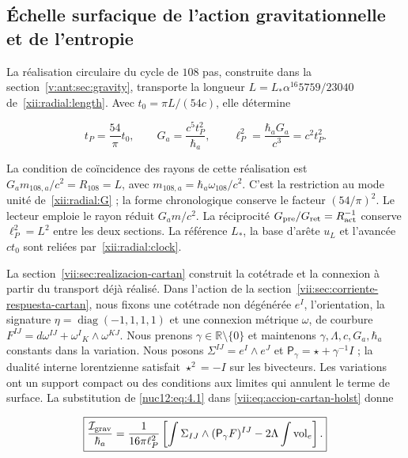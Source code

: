 \subsection{Échelle surfacique de l’action gravitationnelle et de l’entropie}

La réalisation circulaire du cycle de \(108\) pas, construite dans la section~\ref{v:ant:sec:gravity}, transporte la longueur \(L=L_*\alpha^{16}5759/23040\) de~\eqref{xii:radial:length}. Avec \(t_0=\pi L/(54c)\), elle détermine



\begin{equation}
t_P=\frac{54}{\pi}t_0,\qquad
G_a=\frac{c^5t_P^2}{\hbar_a},\qquad
\ell_P^2=\frac{\hbar_aG_a}{c^3}=c^2t_P^2.
\label{nuc12:eq:4.1}
\end{equation}



La condition de coïncidence des rayons de cette réalisation est \(G_a m_{108,a}/c^2=R_{108}=L\), avec \(m_{108,a}=\hbar_a\omega_{108}/c^2\). C’est la restriction au mode unité de~\eqref{xii:radial:G} ; la forme chronologique conserve le facteur \((54/\pi)^2\). Le lecteur emploie le rayon réduit \(G_a m/c^2\). La réciprocité \(G_{\rm pre}/G_{\rm ret}=R_{\rm act}^{-1}\) conserve \(\ell_P^2=L^2\) entre les deux sections. La référence \(L_*\), la base d’arête \(u_L\) et l’avancée \(ct_0\) sont reliées par~\eqref{xii:radial:clock}.

La section~\ref{vii:sec:realizacion-cartan} construit la cotétrade et la connexion à partir du transport déjà réalisé. Dans l’action de la section~\ref{vii:sec:corriente-respuesta-cartan}, nous fixons une cotétrade non dégénérée \(e^I\), l’orientation, la signature \(\eta=\operatorname{diag}(-1,1,1,1)\) et une connexion métrique \(\omega\), de courbure \(F^{IJ}=d\omega^{IJ}+\omega^I{}_{K}\wedge\omega^{KJ}\). Nous prenons \(\gamma\in\mathbb R\setminus\{0\}\) et maintenons \(\gamma,\Lambda,c,G_a,\hbar_a\) constants dans la variation. Nous posons \(\Sigma^{IJ}=e^I\wedge e^J\) et \(\mathsf P_\gamma=\star+\gamma^{-1}I\) ; la dualité interne lorentzienne satisfait \(\star^2=-I\) sur les bivecteurs. Les variations ont un support compact ou des conditions aux limites qui annulent le terme de surface. La substitution de \eqref{nuc12:eq:4.1} dans \eqref{vii:eq:accion-cartan-holst} donne




\begin{equation}
\boxed{\frac{\mathcal I_{\rm grav}}{\hbar_a}
=\frac1{16\pi\ell_P^2}
\left[\int\Sigma_{IJ}\wedge(\mathsf P_\gamma F)^{IJ}
-2\Lambda\int\operatorname{vol}_e\right].}
\label{nuc12:eq:4.2}
\end{equation}



